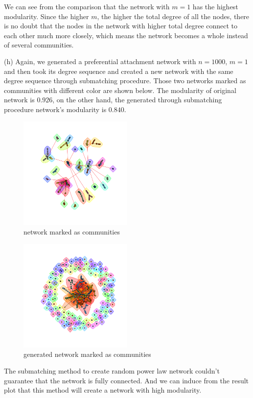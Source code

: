 \documentclass[draftcls,12pt,onecolumn]{IEEEtran}
\begin{document}
We can see from the comparison that the network with $m = 1$ has the highest modularity. Since the higher $m$, the higher the total degree of all the nodes, there is no doubt that the nodes in the network with higher total degree connect to each other much more closely, which means the network becomes a whole instead of several communities.

(h) Again, we generated a preferential attachment network with $n = 1000$, $m = 1$ and then took its degree sequence and created a new network with the same degree sequence through submatching procedure. Those two networks marked as communities with different color are shown below. The modularity of original network is $0.926$, on the other hand, the generated through submatching procedure network's modularity is $0.840$.
\begin{figure}[H]
\centering
\includegraphics[width=0.5\textwidth]{img/2_h_1}
\caption{network marked as communities}
\end{figure}
\begin{figure}[H]
\centering
\includegraphics[width=0.5\textwidth]{img/2_h_2}
\caption{generated network marked as communities}
\end{figure}

The submatching method to create random power law network couldn't guarantee that the network is fully connected. And we can induce from the result plot that this method will create a network with high modularity.
\end{document}
